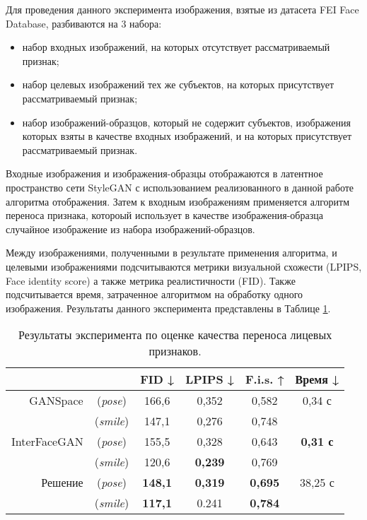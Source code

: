 Для проведения данного эксперимента изображения, взятые из датасета FEI Face Database, разбиваются на 3 набора:
\begin{itemize}

\item набор входных изображений, на которых отсутствует рассматриваемый признак;
\item набор целевых изображений тех же субъектов, на которых присутствует рассматриваемый признак; 
\item набор изображений-образцов, который не содержит субъектов, изображения которых взяты в качестве входных изображений, и на которых присутствует рассматриваемый признак.
\end{itemize}
Входные изображения и изображения-образцы отображаются в латентное пространство сети StyleGAN с использованием реализованного в данной работе алгоритма отображения.
Затем к входным изображениям применяется алгоритм переноса признака, котороый использует в качестве изображения-образца случайное изображение из набора изображений-образцов.

Между изображениями, полученными в результате применения алгоритма, и целевыми изображениями подсчитываются метрики визуальной схожести (LPIPS, Face identity score) а также метрика реалистичности (FID).
Также подсчитывается время, затраченное алгоритмом на обработку одного изображения.
Результаты данного эксперимента представлены в Таблице \ref{tab:exp2}.

\begin{table}
\begin{center}
  \caption{Результаты эксперимента по оценке качества переноса лицевых признаков.}
  \label{tab:exp2}
  \begin{tabular}{ |r c|c|c|c|c| } 
    \hline
      & & FID ↓ & LPIPS ↓ & F.i.s. ↑ & Время ↓ \\ 
    \hline\hline
    GANSpace & (\emph{pose}) & 166,6 & 0,352 & 0,582 & 0,34 с \\
            & (\emph{smile}) & 147,1 & 0,276 & 0,748 &  \\
    \hline
    InterFaceGAN 
             & (\emph{pose}) & 155,5 & 0,328 & 0,643 & \textbf{0,31 с} \\
            & (\emph{smile}) & 120,6 & \textbf{0,239} & 0,769 & \\
    \hline
    Решение  & (\emph{pose}) & \textbf{148,1} & \textbf{0,319} & \textbf{0,695} & 38,25 с \\ 
            & (\emph{smile}) & \textbf{117,1} & 0.241 & \textbf{0,784} &  \\ 
    \hline
  \end{tabular}
\end{center}
\end{table}

